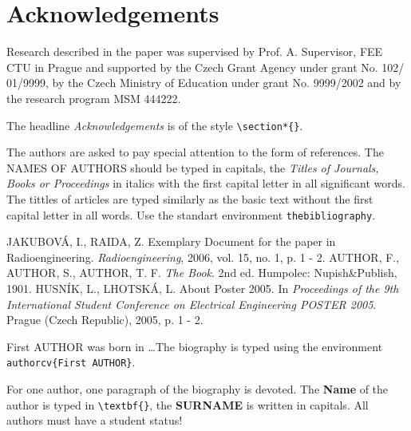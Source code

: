 \documentclass{poster16}
\begin{document}
\section*{Acknowledgements}
Research described in the paper was supervised by Prof. A. Supervisor, FEE CTU in Prague and supported by the Czech Grant Agency under grant No. 102/ 01/9999, by the Czech Ministry of Education under grant No. 9999/2002 and by the research program MSM 444222.

The headline \emph{Acknowledgements} is of the  style \verb+\section*{}+.

The authors are asked to pay special attention to the form of references. The NAMES OF AUTHORS should be typed in capitals, the \emph{Titles of Journals, Books or Proceedings} in italics with the first capital letter in all significant words. The tittles of articles are typed similarly as the basic text without the first capital letter in all words. Use the standart environment \verb+thebibliography+.

\begin{thebibliography}{9}
JAKUBOV\'A, I., RAIDA, Z. Exemplary Document for the paper in Radioengineering. \emph{Radioengineering}, 2006, vol. 15, no. 1, p. 1 - 2.
AUTHOR, F., AUTHOR, S., AUTHOR, T. F. \emph{The Book}. 2nd ed. Humpolec: Nupish\&Publish, 1901.
HUSN\'IK, L., LHOTSK\'A, L. About Poster 2005. In \emph{Proceedings of the 9th International Student Conference on Electrical Engineering POSTER 2005}. Prague (Czech Republic), 2005, p. 1 - 2.
\end{thebibliography}


\begin{authorcv}{First AUTHOR}
was born in \dots The biography is typed using the environment \verb+authorcv{First AUTHOR}+. 

For one author, one paragraph of the biography is devoted. The \textbf{Name} of the author is typed in  \verb+\textbf{}+, the \textbf{SURNAME} is written in capitals.  All authors must have a student status!
\end{authorcv}
\end{document}

